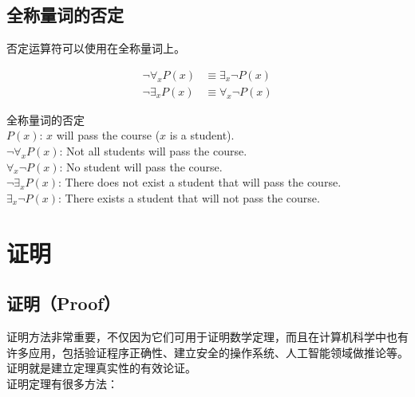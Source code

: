 \documentclass[12pt, openany, oneside]{book}
\begin{document}
\subsection{全称量词的否定}

否定运算符可以使用在全称量词上。

\begin{align}
	\neg \forall_x P(x) & \equiv \exists_x \neg P(x) \\
	\neg \exists_x P(x) & \equiv \forall_x \neg P(x)
\end{align}

\begin{tcolorbox}
	全称量词的否定 \\
	$ P(x) $: $ x $ will pass the course ($ x $ is a student). \\
	$ \neg \forall_x P(x) $: Not all students will pass the course. \\
	$ \forall_x \neg P(x) $: No student will pass the course. \\
	$ \neg \exists_x P(x) $: There does not exist a student that will pass the course. \\
	$ \exists_x \neg P(x) $: There exists a student that will not pass the course.
\end{tcolorbox}

\newpage

\section{证明}

\subsection{证明（Proof）}

证明方法非常重要，不仅因为它们可用于证明数学定理，而且在计算机科学中也有许多应用，包括验证程序正确性、建立安全的操作系统、人工智能领域做推论等。证明就是建立定理真实性的有效论证。 \\

证明定理有很多方法：
\end{document}
